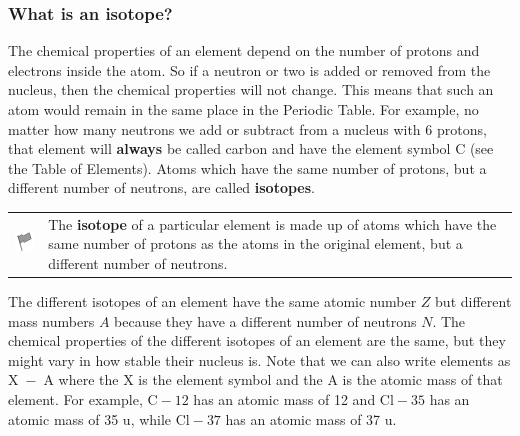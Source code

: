             \subsubsection{ What is an isotope?}
            \nopagebreak
            \label{m38753*id257359}The chemical properties of an element depend on the number of protons and electrons inside the atom. So if a neutron or two is added or removed from the nucleus, then the chemical properties will not change. This means that such an atom would remain in the same place in the Periodic Table. For example, no matter how many neutrons we add or subtract from a nucleus with 6 protons, that element will \textbf{always} be called carbon and have the
element symbol $\mathrm{C}$ (see the Table of Elements). Atoms which have the same number of protons, but a different number of neutrons, are called \textbf{isotopes}.\par 
\label{m38753*fhsst!!!underscore!!!id386}\begin{definition}
	  \begin{tabular*}{15 cm}{m{15 mm}m{}}
	\hspace*{-50pt}  \includegraphics[width=0.5in]{col11305.imgs/psflag2.png}   & \Definition{   \label{id2417667}\textbf{ Isotope }} { \label{m38753*meaningfhsst!!!underscore!!!id386}
        \label{m38753*id257386}The \textbf{isotope} of a particular element is made up of atoms which have the same number of protons as the atoms in the original element, but a different number of neutrons.  \par 
         } 
      \end{tabular*}
      \end{definition}
        \label{m38753*id257405}The different isotopes of an element have the same atomic
number $Z$ but different mass numbers $A$ because they have a different
number of neutrons $N$. The chemical properties of the different
isotopes of an element are the same, but they might vary in how stable their nucleus is. Note that we can also write elements as $\mathrm{X\; -\; A}$ where the X is the element symbol and the A is the atomic mass of that element. For example, $\mathrm{C-}12$ has an atomic mass of 12 and $\mathrm{Cl-}35$ has an atomic mass of 35 u, while $\mathrm{Cl-}37$ has an atomic mass of 37 u.\par 
\label{m38753*notfhsst!!!underscore!!!id393}
